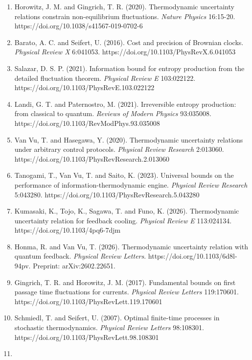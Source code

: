 \documentclass[
  10pt,
]{article}
\begin{document}
\begin{enumerate}
  Dechant, A. and Sasa, S.-i. (2021). Improving thermodynamic bounds
  using correlations. \emph{Physical Review X} 11:041061.
  https://doi.org/10.1103/PhysRevX.11.041061
\item
  Horowitz, J. M. and Gingrich, T. R. (2020). Thermodynamic uncertainty
  relations constrain non-equilibrium fluctuations. \emph{Nature
  Physics} 16:15-20. https://doi.org/10.1038/s41567-019-0702-6
\item
  Barato, A. C. and Seifert, U. (2016). Cost and precision of Brownian
  clocks. \emph{Physical Review X} 6:041053.
  https://doi.org/10.1103/PhysRevX.6.041053
\item
  Salazar, D. S. P. (2021). Information bound for entropy production
  from the detailed fluctuation theorem. \emph{Physical Review E}
  103:022122. https://doi.org/10.1103/PhysRevE.103.022122
\item
  Landi, G. T. and Paternostro, M. (2021). Irreversible entropy
  production: from classical to quantum. \emph{Reviews of Modern
  Physics} 93:035008. https://doi.org/10.1103/RevModPhys.93.035008
\item
  Van Vu, T. and Hasegawa, Y. (2020). Thermodynamic uncertainty
  relations under arbitrary control protocols. \emph{Physical Review
  Research} 2:013060. https://doi.org/10.1103/PhysRevResearch.2.013060
\item
  Tanogami, T., Van Vu, T. and Saito, K. (2023). Universal bounds on the
  performance of information-thermodynamic engine. \emph{Physical Review
  Research} 5:043280. https://doi.org/10.1103/PhysRevResearch.5.043280
\item
  Kumasaki, K., Tojo, K., Sagawa, T. and Funo, K. (2026). Thermodynamic
  uncertainty relation for feedback cooling. \emph{Physical Review E}
  113:024134. https://doi.org/10.1103/4pq6-7djm
\item
  Honma, R. and Van Vu, T. (2026). Thermodynamic uncertainty relation
  with quantum feedback. \emph{Physical Review Letters}.
  https://doi.org/10.1103/6d8l-94pv. Preprint: arXiv:2602.22651.
\item
  Gingrich, T. R. and Horowitz, J. M. (2017). Fundamental bounds on
  first passage time fluctuations for currents. \emph{Physical Review
  Letters} 119:170601. https://doi.org/10.1103/PhysRevLett.119.170601
\item
  Schmiedl, T. and Seifert, U. (2007). Optimal finite-time processes in
  stochastic thermodynamics. \emph{Physical Review Letters} 98:108301.
  https://doi.org/10.1103/PhysRevLett.98.108301
\item

\end{enumerate}
\end{document}
